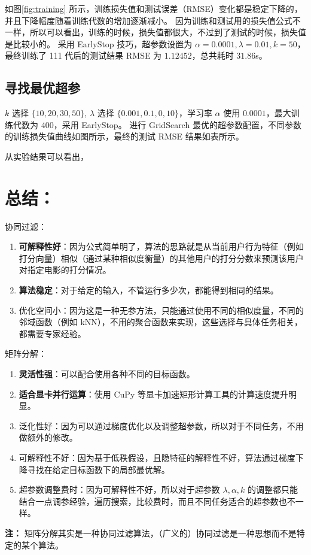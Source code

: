 \documentclass[degree=project, degree-type=project]{thuthesis}
\begin{document}
如图\ref{fig:training} 所示，训练损失值和测试误差（RMSE）变化都是稳定下降的，并且下降幅度随着训练代数的增加逐渐减小。
因为训练和测试用的损失值公式不一样，所以可以看出，训练的时候，损失值都很大，不过到了测试的时候，损失值是比较小的。
采用 EarlyStop 技巧，超参数设置为 $\alpha=0.0001, \lambda = 0.01, k=50$，最终训练了 111 代后的测试结果 RMSE 为 $1.12452$，总共耗时 $31.86$s。

\section{寻找最优超参}

$k$ 选择 $\{10, 20, 30, 50\}$, $\lambda$ 选择 $\{0.001, 0.1, 0, 10\}$，学习率 $\alpha$ 使用 $0.0001$，最大训练代数为 $400$，采用 EarlyStop。
进行 GridSearch 最优的超参数配置，不同参数的训练损失值曲线如图所示，最终的测试 RMSE 结果如表所示。

从实验结果可以看出，

\chapter{总结：}

协同过滤：

\begin{enumerate}
  \item \textbf{可解释性好}：因为公式简单明了，算法的思路就是从当前用户行为特征（例如打分向量）相似（通过某种相似度衡量）的其他用户的打分分数来预测该用户对指定电影的打分情况。
  \item \textbf{算法稳定}：对于给定的输入，不管运行多少次，都能得到相同的结果。
  \item {优化空间小}：因为这是一种无参方法，只能通过使用不同的相似度量，不同的邻域函数（例如 kNN），不用的聚合函数来实现，这些选择与具体任务相关，都需要专家经验。
\end{enumerate}

矩阵分解：

\begin{enumerate}
  \item \textbf{灵活性强}：可以配合使用各种不同的目标函数。
  \item \textbf{适合显卡并行运算}：使用 CuPy 等显卡加速矩形计算工具的计算速度提升明显。
  \item {泛化性好}：因为可以通过梯度优化以及调整超参数，所以对于不同任务，不用做额外的修改。
  \item {可解释性不好}：因为基于低秩假设，且隐特征的解释性不好，算法通过梯度下降寻找在给定目标函数下的局部最优解。
  \item {超参数调整费时}：因为可解释性不好，所以对于超参数 $\lambda, \alpha, k$ 的调整都只能结合一点调参经验，遍历搜索，比较费时，而且不同任务适合的超参数也不一样。
\end{enumerate}

\textbf{注：} 矩阵分解其实是一种协同过滤算法，（广义的）协同过滤是一种思想而不是特定的某个算法。

\backmatter


\appendix
\end{document}
